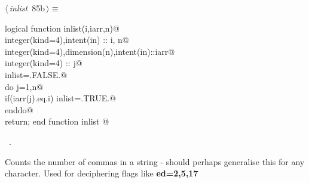\documentclass[10pt,a4paper,notitlepage]{article}
\newcommand{\code}[1]{\textbf{\textsf{#1}}} %
\begin{document}
\begin{flushleft} \small
\begin{minipage}{\linewidth}\label{scrap107}\raggedright\small
{} $\langle\,${\it inlist}\nobreak\ {\footnotesize {85b}}$\,\rangle\equiv$
\vspace{-1ex}
\begin{list}{}{} \item
\mbox{}\verb@      logical function inlist(i,iarr,n)@\\
\mbox{}\verb@      integer(kind=4),intent(in) :: i, n@\\
\mbox{}\verb@      integer(kind=4),dimension(n),intent(in)::iarr@\\
\mbox{}\verb@      integer(kind=4) :: j@\\
\mbox{}\verb@      inlist=.FALSE.@\\
\mbox{}\verb@      do j=1,n@\\
\mbox{}\verb@        if(iarr(j).eq.i) inlist=.TRUE.@\\
\mbox{}\verb@      enddo@\\
\mbox{}\verb@      return; end function inlist                                            @{\NWsep}
\end{list}
\vspace{-1.5ex}
\footnotesize
\begin{list}{}{\setlength{\itemsep}{-\parsep}\setlength{\itemindent}{-\leftmargin}}
\item \NWtxtMacroRefIn\ .

\item{}
\end{list}
\end{minipage}\vspace{4ex}
\end{flushleft}
Counts the number of commas in a string - should perhaps generalise this
for any character. Used for deciphering flags like \code{ed=2,5,17}
\end{document}

